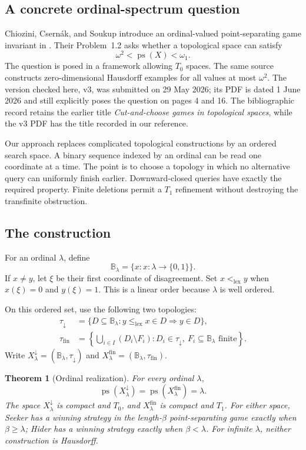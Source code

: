 \documentclass[11pt,a4paper]{article}
\newtheorem{theorem}{Theorem}[section]
\theoremstyle{definition}
\theoremstyle{remark}
\newcommand{\ps}{\operatorname{ps}}
\newcommand{\lex}{\mathrm{lex}}
\newcommand{\fin}{\mathrm{fin}}
\newcommand{\dd}{\downarrow}
\newcommand{\two}{\{0,1\}}
\newcommand{\B}{\mathbb B}
\newcommand{\tauD}{\tau_{\dd}}
\newcommand{\tauF}{\tau_{\fin}}
\begin{document}
\subsection{A concrete ordinal-spectrum question}
Chiozini, Csern\'ak, and Soukup introduce an ordinal-valued point-separating game
invariant in \cite{CCS}. Their Problem~1.2 asks whether a topological space can
satisfy
\begin{equation}\label{eq:problem}
                 \omega^2<\ps(X)<\omega_1.
\end{equation}
The question is posed in a framework allowing $T_0$ spaces. The same source
constructs zero-dimensional Hausdorff examples for all values at most
$\omega^2$. The version checked here, v3, was submitted on 29 May 2026; its PDF
is dated 1 June 2026 and still explicitly poses the question on pages 4 and 16.
The bibliographic record retains the earlier title \emph{Cut-and-choose games
in topological spaces}, while the v3 PDF has the title recorded in our reference.

Our approach replaces complicated topological constructions by an ordered
search space. A binary sequence indexed by an ordinal can be read one coordinate
at a time. The point is to choose a topology in which no alternative query can
uniformly finish earlier. Downward-closed queries have exactly the required
property. Finite deletions permit a $T_1$ refinement without destroying the
transfinite obstruction.

\subsection{The construction}
For an ordinal $\lambda$, define
\[
 \B_\lambda=\{x:x\colon\lambda\longrightarrow\two\}.
\]
If $x\ne y$, let $\xi$ be their first coordinate of disagreement. Set
$x<_{\lex}y$ when $x(\xi)=0$ and $y(\xi)=1$. This is a linear order because
$\lambda$ is well ordered.

On this ordered set, use the following two topologies:
\begin{align}
 \tauD&=\{D\subseteq\B_\lambda:
       y\leq_{\lex}x\in D\Longrightarrow y\in D\},\label{eq:down}\\
 \tauF&=\left\{\bigcup_{i\in I}(D_i\setminus F_i):
       D_i\in\tauD,\ F_i\subseteq\B_\lambda\text{ finite}\right\}.
       \label{eq:finite-top}
\end{align}
Write $X_\lambda^\dd=(\B_\lambda,\tauD)$ and
$X_\lambda^\fin=(\B_\lambda,\tauF)$.

\begin{theorem}[Ordinal realization]\label{thm:main}
For every ordinal $\lambda$,
\begin{equation}\label{eq:main}
             \ps(X_\lambda^\dd)=\ps(X_\lambda^\fin)=\lambda.
\end{equation}
The space $X_\lambda^\dd$ is compact and $T_0$, and
$X_\lambda^\fin$ is compact and $T_1$. For either space, Seeker has a winning
strategy in the length-$\beta$ point-separating game exactly when
$\beta\geq\lambda$; Hider has a winning strategy exactly when $\beta<\lambda$.
For infinite $\lambda$, neither construction is Hausdorff.
\end{theorem}
\end{document}
